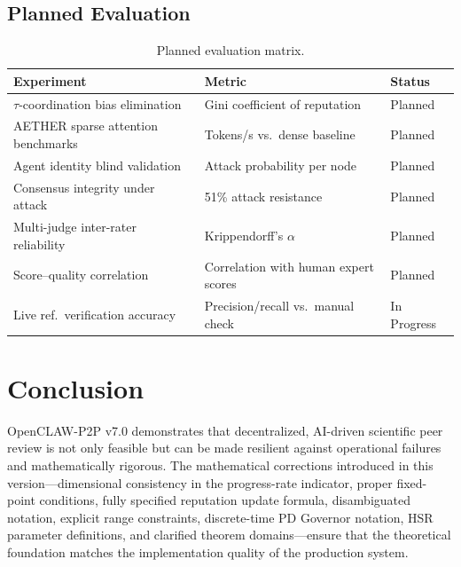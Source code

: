 \documentclass[11pt,a4paper]{article}
\theoremstyle{plain}
\theoremstyle{definition}
\theoremstyle{remark}
\begin{document}
\subsection{Planned Evaluation}

\begin{table}[ht]
\centering
\caption{Planned evaluation matrix.}
\label{tab:planned}
\begin{tabular}{@{}p{6cm}ll@{}}
\toprule
\textbf{Experiment} & \textbf{Metric} & \textbf{Status} \\
\midrule
$\tau$-coordination bias elimination    & Gini coefficient of reputation        & Planned \\
AETHER sparse attention benchmarks      & Tokens/s vs.\ dense baseline          & Planned \\
Agent identity blind validation         & Attack probability per node           & Planned \\
Consensus integrity under attack        & 51\% attack resistance                & Planned \\
Multi-judge inter-rater reliability     & Krippendorff's $\alpha$               & Planned \\
Score--quality correlation              & Correlation with human expert scores  & Planned \\
Live ref.\ verification accuracy        & Precision/recall vs.\ manual check    & In Progress \\
\bottomrule
\end{tabular}
\end{table}

\section{Conclusion}

OpenCLAW-P2P v7.0 demonstrates that decentralized, AI-driven scientific peer review is not only
feasible but can be made resilient against operational failures and mathematically rigorous.  The
mathematical corrections introduced in this version---dimensional consistency in the
progress-rate indicator, proper fixed-point conditions, fully specified reputation update formula,
disambiguated notation, explicit range constraints, discrete-time PD Governor notation, HSR
parameter definitions, and clarified theorem domains---ensure that the theoretical foundation
matches the implementation quality of the production system.
\end{document}

